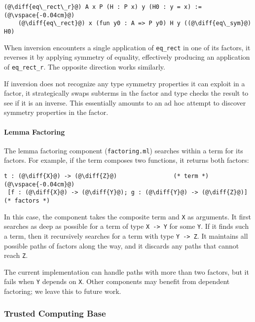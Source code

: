 \begin{lstlisting}[language=coq]
  (@\diff{eq\_rect\_r}@) A x P (H : P x) y (H0 : y = x) :=(@\vspace{-0.04cm}@)
    (@\diff{eq\_rect}@) x (fun y0 : A => P y0) H y ((@\diff{eq\_sym}@) H0)	
\end{lstlisting} %
When inversion encounters a single application of \lstinline{eq_rect} in one of its factors,
it reverses it by applying symmetry of equality, effectively producing an application of \lstinline{eq_rect_r}.
The opposite direction works similarly.

If inversion does not recognize any type symmetry properties it can exploit in a factor, it
strategically swaps subterms in the factor and type checks the result to see if it is an inverse.
This essentially amounts to an ad hoc attempt to discover symmetry properties in the factor.

\paragraph{Lemma Factoring} The lemma factoring component (\lstinline{factoring.ml}) searches within a term
for its factors. For example,
if the term composes two functions, it returns both factors:

\begin{lstlisting}[language=coq]
  t : (@\diff{X}@) -> (@\diff{Z}@)                (* term *)(@\vspace{-0.04cm}@)
 [f : (@\diff{X}@) -> (@\diff{Y}@); g : (@\diff{Y}@) -> (@\diff{Z}@)] (* factors *)
\end{lstlisting}
In this case, the component takes the composite term and \lstinline{X} as arguments.
It first searches as deep as possible for a term of type \lstinline{X -> Y} for some \lstinline{Y}.
If it finds such a term, then it recursively searches for a term with type \lstinline{Y -> Z}. 
It maintains all possible 
paths of factors along the way, and it discards any paths that cannot reach \lstinline{Z}.

The current implementation can handle paths
with more than two factors, but it fails when \lstinline{Y} depends on \lstinline{X}.
Other components may benefit from dependent factoring; we leave this to future work.

\subsubsection{Trusted Computing Base}
\label{sec:tcb}

